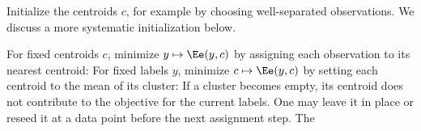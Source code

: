 Initialize the centroids $c$, for example by choosing well-separated observations. We discuss a more systematic initialization below.
  
For fixed centroids $c$, minimize $y \mapsto \Ee(y,c)$ by assigning each observation to its nearest centroid:
For fixed labels $y$, minimize $c \mapsto \Ee(y,c)$ by setting each centroid to the mean of its cluster:
If a cluster becomes empty, its centroid does not contribute to the objective for the current labels. One may leave it in place or reseed it at a data point before the next assignment step. The 